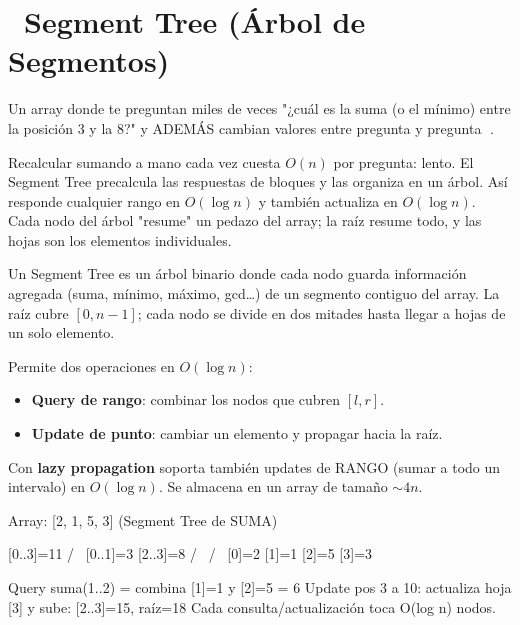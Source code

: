 \chapter[\emj{🎄}~Segment Tree (Árbol de Segmentos)]{~Segment Tree (Árbol de Segmentos)}

\begin{dsaquees}

Un array donde te preguntan miles de veces "¿cuál es la suma (o el
mínimo) entre la posición 3 y la 8?" y ADEMÁS cambian valores entre
pregunta y pregunta 🔄.

Recalcular sumando a mano cada vez cuesta $O(n)$ por pregunta: lento. El
Segment Tree precalcula las respuestas de bloques y las organiza en un
árbol. Así responde cualquier rango en $O(\log n)$ y también actualiza en
$O(\log n)$. Cada nodo del árbol "resume" un pedazo del array; la raíz
resume todo, y las hojas son los elementos individuales.

\end{dsaquees}

\begin{dsaotraforma}

Un Segment Tree es un árbol binario donde cada nodo guarda información
agregada (suma, mínimo, máximo, gcd\ldots) de un segmento contiguo del
array. La raíz cubre $[0, n-1]$; cada nodo se divide en dos mitades hasta
llegar a hojas de un solo elemento.

Permite dos operaciones en $O(\log n)$:
\begin{itemize}
\item \textbf{Query de rango}: combinar los nodos que cubren $[l, r]$.
\item \textbf{Update de punto}: cambiar un elemento y propagar hacia la
      raíz.
\end{itemize}

Con \textbf{lazy propagation} soporta también updates de RANGO (sumar a
todo un intervalo) en $O(\log n)$. Se almacena en un array de tamaño
$\sim 4n$.

\end{dsaotraforma}

\begin{dsadiagrama}
Array: [2, 1, 5, 3]   (Segment Tree de SUMA)

              [0..3]=11
             /          \
       [0..1]=3        [2..3]=8
        /    \          /    \
   [0]=2  [1]=1    [2]=5   [3]=3

Query suma(1..2) = combina [1]=1 y [2]=5 = 6
Update pos 3 a 10: actualiza hoja [3] y sube: [2..3]=15, raíz=18
Cada consulta/actualización toca O(log n) nodos.
\end{dsadiagrama}

